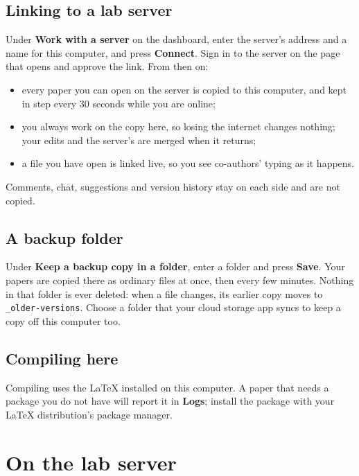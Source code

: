 \documentclass[11pt]{article}
\newcommand{\ui}[1]{\textbf{#1}}
\begin{document}
\subsection{Linking to a lab server}\label{sec:server-link}
Under \ui{Work with a server} on the dashboard, enter the server's address and a
name for this computer, and press \ui{Connect}. Sign in to the server on the page
that opens and approve the link. From then on:
\begin{itemize}
  \item every paper you can open on the server is copied to this computer, and
    kept in step every 30 seconds while you are online;
  \item you always work on the copy here, so losing the internet changes
    nothing; your edits and the server's are merged when it returns;
  \item a file you have open is linked live, so you see co-authors' typing as it
    happens.
\end{itemize}
Comments, chat, suggestions and version history stay on each side and are not
copied.

\subsection{A backup folder}\label{sec:backup}
Under \ui{Keep a backup copy in a folder}, enter a folder and press \ui{Save}.
Your papers are copied there as ordinary files at once, then every few minutes.
Nothing in that folder is ever deleted: when a file changes, its earlier copy
moves to \texttt{\_older-versions}. Choose a folder that your cloud storage app
syncs to keep a copy off this computer too.

\subsection{Compiling here}
Compiling uses the LaTeX installed on this computer. A paper that needs a
package you do not have will report it in \ui{Logs}; install the package with
your LaTeX distribution's package manager.

\section{On the lab server}
\end{document}
